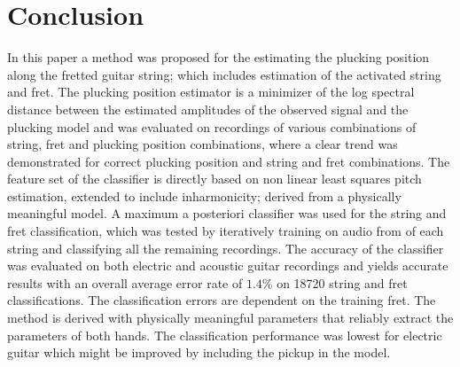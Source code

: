 \documentclass{article}
\begin{document}
\section{Conclusion} 
\label{sec:conclusion}
In this paper a method was proposed for the estimating the plucking position along the fretted guitar string; which includes estimation of the activated string and fret. The plucking position estimator is a minimizer of the log spectral distance between the estimated amplitudes of the observed signal and the plucking model and was evaluated on recordings of various combinations of string, fret and plucking position combinations, where a clear trend was demonstrated for correct plucking position and string and fret combinations. The feature set of the classifier is directly based on non linear least squares pitch estimation, extended to include inharmonicity; derived from a physically meaningful model. A maximum a posteriori classifier was used for the string and fret classification, which was tested by iteratively training on audio from of each string and classifying all the remaining recordings. The accuracy of the classifier was evaluated on both electric and acoustic guitar recordings and yields accurate results with an overall average error rate of $1.4\%$ on 18720 string and fret classifications. The classification errors are dependent on the training fret. The method is derived with physically meaningful parameters that reliably extract the parameters of both hands. The classification performance was lowest for electric guitar which might be improved by including the pickup in the model. 
%
%
%
%
%
\vfill\pagebreak

%

\end{document}
